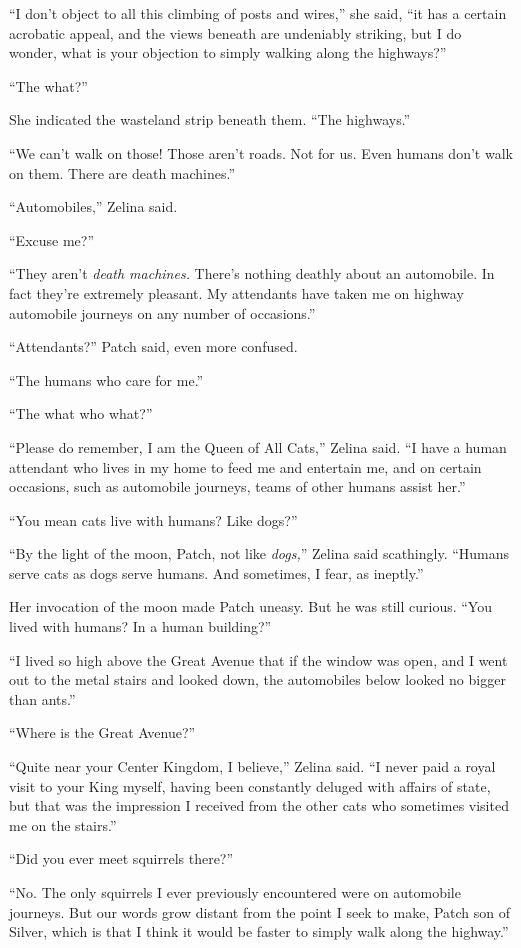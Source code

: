 \documentclass[ebook,oneside,openany,17pt]{memoir}
\begin{document}
“I don’t object to all this climbing of posts and wires,” she said,
“it has a certain acrobatic appeal, and the views beneath are
undeniably striking, but I do wonder, what is your objection to simply
walking along the highways?”

“The what?”

She indicated the wasteland strip beneath them. “The highways.”

“We can’t walk on those! Those aren’t roads. Not for us. Even humans
don’t walk on them. There are death machines.”

“Automobiles,” Zelina said.

“Excuse me?”

“They aren’t \emph{death machines.} There’s nothing deathly about an
automobile. In fact they’re extremely pleasant. My attendants have
taken me on highway automobile journeys on any number of occasions.”

“Attendants?” Patch said, even more confused.

“The humans who care for me.”

“The what who what?”

“Please do remember, I am the Queen of All Cats,” Zelina said. “I have
a human attendant who lives in my home to feed me and entertain me,
and on certain occasions, such as automobile journeys, teams of other
humans assist her.”

“You mean cats live with humans? Like dogs?”

“By the light of the moon, Patch, not like \emph{dogs,}” Zelina said
scathingly. “Humans serve cats as dogs serve humans. And sometimes, I
fear, as ineptly.”

Her invocation of the moon made Patch uneasy. But he was still
curious. “You lived with humans? In a human building?”

“I lived so high above the Great Avenue that if the window was open,
and I went out to the metal stairs and looked down, the automobiles
below looked no bigger than ants.”

“Where is the Great Avenue?”

“Quite near your Center Kingdom, I believe,” Zelina said. “I never
paid a royal visit to your King myself, having been constantly deluged
with affairs of state, but that was the impression I received from the
other cats who sometimes visited me on the stairs.”

“Did you ever meet squirrels there?”

“No. The only squirrels I ever previously encountered were on
automobile journeys. But our words grow distant from the point I seek
to make, Patch son of Silver, which is that I think it would be faster
to simply walk along the highway.”
\end{document}
